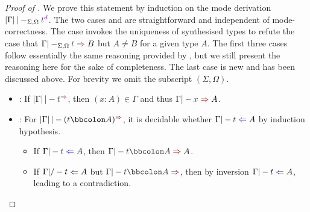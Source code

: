 \begin{proof}[Proof of {}]
  We prove this statement by induction on the mode derivation\/ $\erase{\Gamma} |-_{\Sigma, \Omega} \isTerm{t}^{\dir{d}}$.
  The two cases  and  are straightforward and independent of mode-correctness.
  The case  invokes the uniqueness of synthesised types to refute the case that $\Gamma |-_{\Sigma, \Omega} \isTerm{t} \syn B$ but $A \neq B$ for a given type $A$.
  The first three cases follow essentially the same reasoning provided by \citet{Wadler2022}, but we still present the reasoning here for the sake of completeness.
  The last case  is new and has been discussed above.
  For brevity we omit the subscript $(\Sigma, \Omega)$.
  \begin{itemize}
    \item {}: If $\erase{\Gamma} |- \isTerm{t}^{\syn}$, then $(x : A) \in \Gamma$ and thus $\Gamma |- \isTerm{x} \syn A$.

    \item {}: For $\erase{\Gamma} |- (\isTerm{t} \annotate A)^{\syn}$, it is decidable whether $\Gamma |- \isTerm{t} \chk A$ by induction hypothesis.
      \begin{itemize}
        \item If $\Gamma |- \isTerm{t} \chk A$, then $\Gamma |- \isTerm{t \annotate A} \syn A$.
        \item If $\Gamma |/- t \chk A$ but $\Gamma |- \isTerm{t \annotate A} \syn$, then by inversion $\Gamma |- t \chk A$, leading to a contradiction.
      \end{itemize}
      

\end{itemize}
\end{proof}
